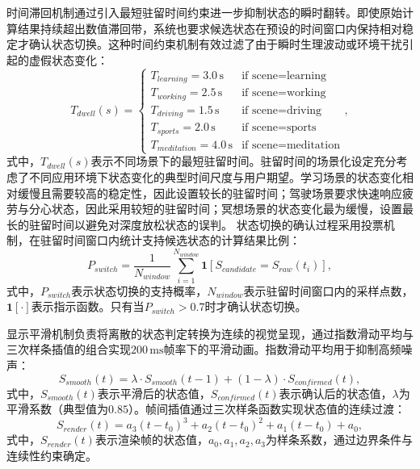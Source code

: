 时间滞回机制通过引入最短驻留时间约束进一步抑制状态的瞬时翻转。即使原始计算结果持续超出数值滞回带，系统也要求候选状态在预设的时间窗口内保持相对稳定才确认状态切换。这种时间约束机制有效过滤了由于瞬时生理波动或环境干扰引起的虚假状态变化：
\begin{equation}
T_{dwell}(s) = \begin{cases}
T_{learning} = 3.0\,\text{s} & \text{if scene} = \text{learning} \\
T_{working} = 2.5\,\text{s} & \text{if scene} = \text{working} \\
T_{driving} = 1.5\,\text{s} & \text{if scene} = \text{driving} \\
T_{sports} = 2.0\,\text{s} & \text{if scene} = \text{sports} \\
T_{meditation} = 4.0\,\text{s} & \text{if scene} = \text{meditation}
\end{cases},
\end{equation}
式中，$T_{dwell}(s)$表示不同场景下的最短驻留时间。驻留时间的场景化设定充分考虑了不同应用环境下状态变化的典型时间尺度与用户期望。学习场景的状态变化相对缓慢且需要较高的稳定性，因此设置较长的驻留时间；驾驶场景要求快速响应疲劳与分心状态，因此采用较短的驻留时间；冥想场景的状态变化最为缓慢，设置最长的驻留时间以避免对深度放松状态的误判。
状态切换的确认过程采用投票机制，在驻留时间窗口内统计支持候选状态的计算结果比例：
\begin{equation}
P_{switch} = \frac{1}{N_{window}} \sum_{i=1}^{N_{window}} \mathbf{1}[S_{candidate} = S_{raw}(t_i)],
\end{equation}
式中，$P_{switch}$表示状态切换的支持概率，$N_{window}$表示驻留时间窗口内的采样点数，$\mathbf{1}[\cdot]$表示指示函数。只有当$P_{switch} > 0.7$时才确认状态切换。

显示平滑机制负责将离散的状态判定转换为连续的视觉呈现，通过指数滑动平均与三次样条插值的组合实现$200\,\text{ms}$帧率下的平滑动画。指数滑动平均用于抑制高频噪声：
\begin{equation}
S_{smooth}(t) = \lambda \cdot S_{smooth}(t-1) + (1-\lambda) \cdot S_{confirmed}(t),
\end{equation}
式中，$S_{smooth}(t)$表示平滑后的状态值，$S_{confirmed}(t)$表示确认后的状态值，$\lambda$为平滑系数（典型值为$0.85$）。帧间插值通过三次样条函数实现状态值的连续过渡：
\begin{equation}
S_{render}(t) = a_3(t-t_0)^3 + a_2(t-t_0)^2 + a_1(t-t_0) + a_0,
\end{equation}
式中，$S_{render}(t)$表示渲染帧的状态值，$a_0, a_1, a_2, a_3$为样条系数，通过边界条件与连续性约束确定。

